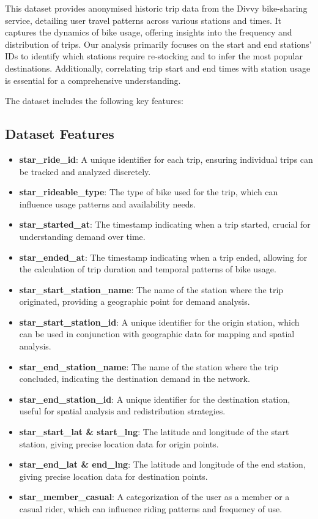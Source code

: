 This dataset provides anonymised historic trip data from the Divvy bike-sharing service, detailing user travel patterns across various stations and times.
It captures the dynamics of bike usage, offering insights into the frequency and distribution of trips.
Our analysis primarily focuses on the start and end stations' IDs to identify which stations require re-stocking and to infer the most popular destinations.
Additionally, correlating trip start and end times with station usage is essential for a comprehensive understanding.\newline

The dataset includes the following key features:\newline

\subsection{Dataset Features}\label{subsec:dataset-features}
\begin{itemize}
    \item \textbf{star\_ride\_id}: A unique identifier for each trip, ensuring individual trips can be tracked and analyzed discretely.
    \item \textbf{star\_rideable\_type}: The type of bike used for the trip, which can influence usage patterns and availability needs.
    \item \textbf{star\_started\_at}: The timestamp indicating when a trip started, crucial for understanding demand over time.
    \item \textbf{star\_ended\_at}: The timestamp indicating when a trip ended, allowing for the calculation of trip duration and temporal patterns of bike usage.
    \item \textbf{star\_start\_station\_name}: The name of the station where the trip originated, providing a geographic point for demand analysis.
    \item \textbf{star\_start\_station\_id}: A unique identifier for the origin station, which can be used in conjunction with geographic data for mapping and spatial analysis.
    \item \textbf{star\_end\_station\_name}: The name of the station where the trip concluded, indicating the destination demand in the network.
    \item \textbf{star\_end\_station\_id}: A unique identifier for the destination station, useful for spatial analysis and redistribution strategies.
    \item \textbf{star\_start\_lat \& start\_lng}: The latitude and longitude of the start station, giving precise location data for origin points.
    \item \textbf{star\_end\_lat \& end\_lng}: The latitude and longitude of the end station, giving precise location data for destination points.
    \item \textbf{star\_member\_casual}: A categorization of the user as a member or a casual rider, which can influence riding patterns and frequency of use.
\end{itemize}

